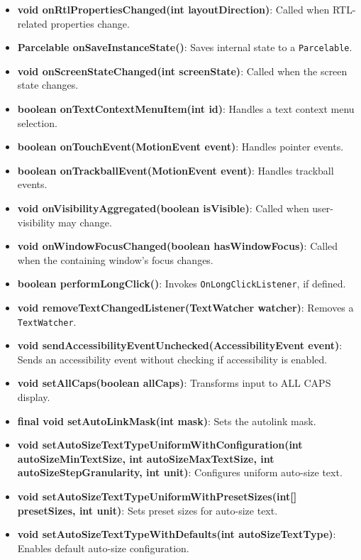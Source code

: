 \documentclass{report}
\begin{document}
\begin{itemize}
\begin{itemize}
                \item \textbf{void onRtlPropertiesChanged(int layoutDirection)}: Called when RTL-related properties change.
                \item \textbf{Parcelable onSaveInstanceState()}: Saves internal state to a \texttt{Parcelable}.
                \item \textbf{void onScreenStateChanged(int screenState)}: Called when the screen state changes.
                \item \textbf{boolean onTextContextMenuItem(int id)}: Handles a text context menu selection.
                \item \textbf{boolean onTouchEvent(MotionEvent event)}: Handles pointer events.
                \item \textbf{boolean onTrackballEvent(MotionEvent event)}: Handles trackball events.
                \item \textbf{void onVisibilityAggregated(boolean isVisible)}: Called when user-visibility may change.
                \item \textbf{void onWindowFocusChanged(boolean hasWindowFocus)}: Called when the containing window’s focus changes.
                \item \textbf{boolean performLongClick()}: Invokes \texttt{OnLongClickListener}, if defined.
                \item \textbf{void removeTextChangedListener(TextWatcher watcher)}: Removes a \texttt{TextWatcher}.
                \item \textbf{void sendAccessibilityEventUnchecked(AccessibilityEvent event)}: Sends an accessibility event without checking if accessibility is enabled.
                \item \textbf{void setAllCaps(boolean allCaps)}: Transforms input to ALL CAPS display.
                \item \textbf{final void setAutoLinkMask(int mask)}: Sets the autolink mask.
                \item \textbf{void setAutoSizeTextTypeUniformWithConfiguration(int autoSizeMinTextSize, int autoSizeMaxTextSize, int autoSizeStepGranularity, int unit)}: Configures uniform auto-size text.
                \item \textbf{void setAutoSizeTextTypeUniformWithPresetSizes(int[] presetSizes, int unit)}: Sets preset sizes for auto-size text.
                \item \textbf{void setAutoSizeTextTypeWithDefaults(int autoSizeTextType)}: Enables default auto-size configuration.

\end{itemize}
\end{itemize}
\end{document}
